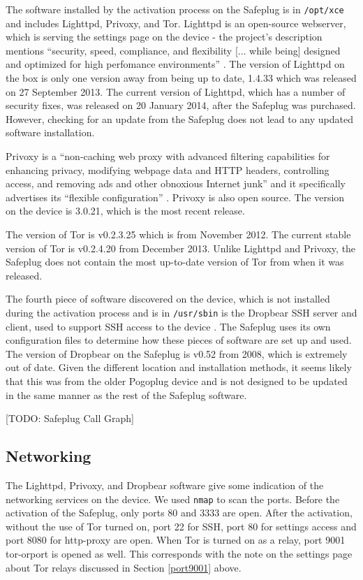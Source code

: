 \documentclass[conference]{IEEEtran}
\begin{document}
The software installed by the activation process on the Safeplug is in \verb!/opt/xce! and includes Lighttpd, Privoxy, and Tor.  Lighttpd is an open-source webserver, which is serving the settings page on the device - the project's description mentions ``security, speed, compliance, and flexibility [... while being] designed and optimized for high perfomance environments'' \cite{lighttpd}.  The version of Lighttpd on the box is only one version away from being up to date, 1.4.33 which was released on 27 September 2013.  The current version of Lighttpd, which has a number of security fixes, was released on 20 January 2014, after the Safeplug was purchased.  However, checking for an update from the Safeplug does not lead to any updated software installation.

Privoxy is a ``non-caching web proxy with advanced filtering capabilities for enhancing privacy, modifying webpage data and HTTP headers, controlling access, and removing ads and other obnoxious Internet junk'' and it specifically advertises its ``flexible configuration'' \cite{privoxy}.  Privoxy is also open source.  The version on the device is 3.0.21, which is the most recent release.

The version of Tor is v0.2.3.25 which is from November 2012.  The current stable version of Tor is v0.2.4.20 from December 2013.  Unlike Lighttpd and Privoxy, the Safeplug does not contain the most up-to-date version of Tor from when it was released.

The fourth piece of software discovered on the device, which is not installed during the activation process and is in \verb!/usr/sbin! is the Dropbear SSH server and client, used to support SSH access to the device \cite{dropbear}.  The Safeplug uses its own configuration files to determine how these pieces of software are set up and used.  The version of Dropbear on the Safeplug is v0.52 from 2008, which is extremely out of date.  Given the different location and installation methods, it seems likely that this was from the older Pogoplug device and is not designed to be updated in the same manner as the rest of the Safeplug software.

[TODO: Safeplug Call Graph]

\subsection{Networking}
The Lighttpd, Privoxy, and Dropbear software give some indication of the networking services on the device.  We used \texttt{nmap} to scan the ports.  Before the activation of the Safeplug, only ports 80 and 3333 are open.  After the activation, without the use of Tor turned on, port 22 for SSH, port 80 for settings access and port 8080 for http-proxy are open.  When Tor is turned on as a relay, port 9001 tor-orport is opened as well.  This corresponds with the note on the settings page about Tor relays discussed in Section \ref{port9001} above.
    
\end{document}
